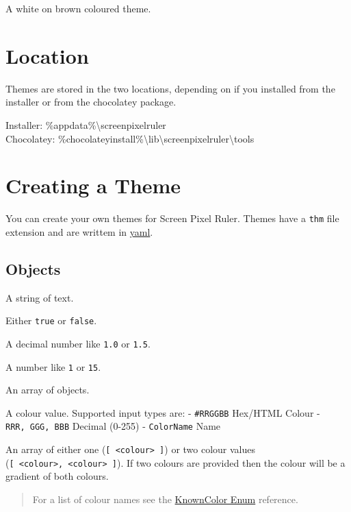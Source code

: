 \documentclass[
]{book}
\begin{document}
A white on brown coloured theme.

\hypertarget{location-1}{%
\section{Location}\label{location-1}}

Themes are stored in the two locations, depending on if you installed from the installer or from the chocolatey package.

Installer: \%appdata\%\textbackslash screenpixelruler\\
Chocolatey: \%chocolateyinstall\%\textbackslash lib\textbackslash screenpixelruler\textbackslash tools

\hypertarget{creating-a-theme}{%
\section{Creating a Theme}\label{creating-a-theme}}

You can create your own themes for Screen Pixel Ruler.
Themes have a \texttt{thm} file extension and are writtem in \href{https://yaml.org}{yaml}.

\hypertarget{objects}{%
\subsection{Objects}\label{objects}}

A string of text.

Either \texttt{true} or \texttt{false}.

A decimal number like \texttt{1.0} or \texttt{1.5}.

A number like \texttt{1} or \texttt{15}.

An array of objects.

A colour value.
Supported input types are:
- \texttt{\textquotesingle{}\#RRGGBB\textquotesingle{}} Hex/HTML Colour
- \texttt{RRR,\ GGG,\ BBB} Decimal (0-255)
- \texttt{ColorName} Name

An array of either one (\texttt{{[}\ \textless{}colour\textgreater{}\ {]}}) or two colour values (\texttt{{[}\ \textless{}colour\textgreater{},\ \textless{}colour\textgreater{}\ {]}}).
If two colours are provided then the colour will be a gradient of both colours.

\begin{quote}
For a list of colour names see the \href{https://docs.microsoft.com/en-us/dotnet/api/system.drawing.knowncolor?view=netcore-3.1}{KnownColor Enum} reference.
\end{quote}
\end{document}
